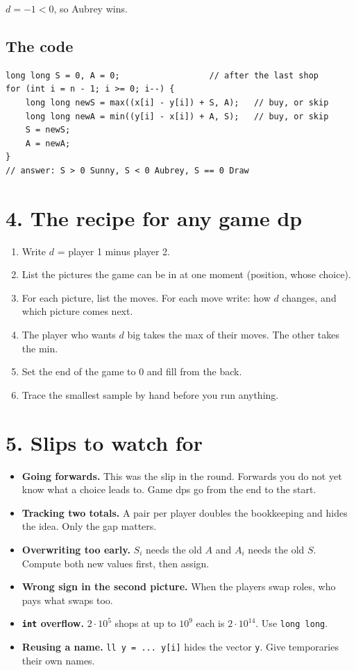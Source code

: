 \documentclass[11pt]{article}
\begin{document}
$d = -1 < 0$, so Aubrey wins.

\subsection*{The code}

\begin{lstlisting}
long long S = 0, A = 0;                  // after the last shop
for (int i = n - 1; i >= 0; i--) {
    long long newS = max((x[i] - y[i]) + S, A);   // buy, or skip
    long long newA = min((y[i] - x[i]) + A, S);   // buy, or skip
    S = newS;
    A = newA;
}
// answer: S > 0 Sunny, S < 0 Aubrey, S == 0 Draw
\end{lstlisting}

\section*{4. The recipe for any game dp}

\begin{enumerate}
  \item Write $d$ = player 1 minus player 2.
  \item List the pictures the game can be in at one moment (position, whose choice).
  \item For each picture, list the moves. For each move write: how $d$ changes, and which picture comes next.
  \item The player who wants $d$ big takes the max of their moves. The other takes the min.
  \item Set the end of the game to $0$ and fill from the back.
  \item Trace the smallest sample by hand before you run anything.
\end{enumerate}

\section*{5. Slips to watch for}

\begin{itemize}
  \item \textbf{Going forwards.} This was the slip in the round. Forwards you do not
        yet know what a choice leads to. Game dps go from the end to the start.
  \item \textbf{Tracking two totals.} A pair per player doubles the bookkeeping and
        hides the idea. Only the gap matters.
  \item \textbf{Overwriting too early.} $S_i$ needs the old $A$ and $A_i$ needs the
        old $S$. Compute both new values first, then assign.
  \item \textbf{Wrong sign in the second picture.} When the players swap roles, who
        pays what swaps too.
  \item \textbf{\texttt{int} overflow.} $2\cdot10^5$ shops at up to $10^9$ each is
        $2\cdot10^{14}$. Use \texttt{long long}.
  \item \textbf{Reusing a name.} \texttt{ll y = ... y[i]} hides the vector \texttt{y}.
        Give temporaries their own names.
\end{itemize}
\end{document}
